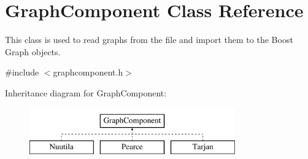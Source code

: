 \hypertarget{class_graph_component}{}\section{Graph\+Component Class Reference}
\label{class_graph_component}


This class is used to read graphs from the file and import them to the Boost Graph objects.  




{\ttfamily \#include $<$graphcomponent.\+h$>$}

Inheritance diagram for Graph\+Component\+:\begin{figure}[H]
\begin{center}
\leavevmode
\includegraphics[height=2.000000cm]{class_graph_component}
\end{center}
\end{figure}
